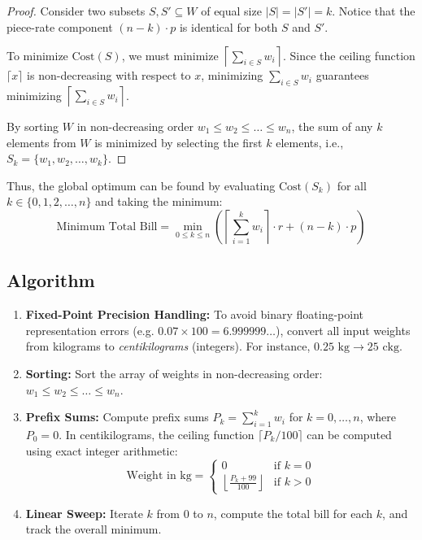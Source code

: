 \documentclass[a4paper,12pt]{article}
\begin{document}
\begin{proof}
Consider two subsets $S, S' \subseteq W$ of equal size $|S| = |S'| = k$. Notice that the piece-rate component $(n - k) \cdot p$ is identical for both $S$ and $S'$.

To minimize $\text{Cost}(S)$, we must minimize $\left\lceil \sum_{i \in S} w_i \right\rceil$. Since the ceiling function $\lceil x \rceil$ is non-decreasing with respect to $x$, minimizing $\sum_{i \in S} w_i$ guarantees minimizing $\left\lceil \sum_{i \in S} w_i \right\rceil$.

By sorting $W$ in non-decreasing order $w_1 \le w_2 \le \ldots \le w_n$, the sum of any $k$ elements from $W$ is minimized by selecting the first $k$ elements, i.e., $S_k = \{w_1, w_2, \ldots, w_k\}$.
\end{proof}

Thus, the global optimum can be found by evaluating $\text{Cost}(S_k)$ for all $k \in \{0, 1, 2, \ldots, n\}$ and taking the minimum:
\[
\text{Minimum Total Bill} = \min_{0 \le k \le n} \left( \left\lceil \sum_{i=1}^k w_i \right\rceil \cdot r + (n - k) \cdot p \right)
\]

\subsection*{Algorithm}
\begin{enumerate}
    \item \textbf{Fixed-Point Precision Handling:} To avoid binary floating-point representation errors (e.g. $0.07 \times 100 = 6.999999\ldots$), convert all input weights from kilograms to \emph{centikilograms} (integers). For instance, $0.25 \text{ kg} \to 25 \text{ ckg}$.
    \item \textbf{Sorting:} Sort the array of weights in non-decreasing order: $w_1 \le w_2 \le \ldots \le w_n$.
    \item \textbf{Prefix Sums:} Compute prefix sums $P_k = \sum_{i=1}^k w_i$ for $k = 0, \ldots, n$, where $P_0 = 0$. In centikilograms, the ceiling function $\lceil P_k / 100 \rceil$ can be computed using exact integer arithmetic:
    \[
    \text{Weight in kg} = \begin{cases} 
    0 & \text{if } k = 0 \\
    \left\lfloor \frac{P_k + 99}{100} \right\rfloor & \text{if } k > 0 
    \end{cases}
    \]
    \item \textbf{Linear Sweep:} Iterate $k$ from $0$ to $n$, compute the total bill for each $k$, and track the overall minimum.
\end{enumerate}
\end{document}
